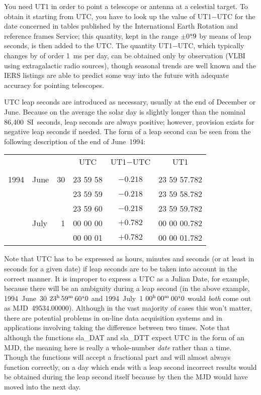 \documentclass[11pt,twoside,nolof]{starlink}
\providecommand{\tseci}[1]   {$#1$\mbox{$^{\rm s}$}}
\providecommand{\tsec}[2]    {\tseci{#1}$\hspace{-0.3em}.#2$}
\providecommand{\hms}[4]    {$#1^{\rm h}\,#2^{\rm m}\,$\tsec{#3}{#4}}
\begin{document}
You need UT1 in order to point a telescope or antenna at a
celestial target.  To obtain it
starting from UTC, you
have to look up the value of UT1$-$UTC for the date concerned
in tables published by the International Earth Rotation and
reference frames
Service;  this quantity, kept in the range
$\pm$\tsec{0}{9} by means of leap
seconds, is then added to the UTC.  The quantity UT1$-$UTC,
which typically changes by of order 1~ms per day,
can be obtained only by observation (VLBI using
extragalactic radio sources), though seasonal trends
are well known and the IERS listings are able to predict some way into
the future with adequate accuracy for pointing telescopes.

UTC leap seconds are introduced as necessary,
usually at the end of December or June.
Because on the average the solar day is slightly longer
than the nominal 86,400~SI~seconds, leap seconds are always positive;
however, provision exists for negative leap seconds if needed.
The form of a leap second can be seen from the
following description of the end of June~1994:

\hspace{3em}
\begin{tabular}{clrccc} \\
     &      &    &   UTC    & UT1$-$UTC  &    UT1       \\ \\
1994 & June & 30 & 23 59 58 & $-0.218$ & 23 59 57.782 \\
     &      &    & 23 59 59 & $-0.218$ & 23 59 58.782 \\
     &      &    & 23 59 60 & $-0.218$ & 23 59 59.782 \\
     & July &  1 & 00 00 00 & $+0.782$ & 00 00 00.782 \\
     &      &    & 00 00 01 & $+0.782$ & 00 00 01.782 \\
\end{tabular}
\goodbreak

Note that UTC has to be expressed as hours, minutes and
seconds (or at least in seconds for a given date) if leap seconds
are to be taken into account in the
correct manner.
It is improper to express a UTC as a
Julian Date, for example, because there will be an ambiguity
during a leap second (in the above example,
1994~June~30 \hms{23}{59}{60}{0} and
1994~July~1 \hms{00}{00}{00}{0} would \textit{both}\/ come out as
MJD~49534.00000).  Although in the vast majority of
cases this won't matter, there are potential problems in
on-line data acquisition systems and in applications involving
taking the difference between two times.  Note that although the functions
sla\_DAT
and
sla\_DTT
expect UTC in the form of an MJD, the meaning here is really a
whole-number \textit{date}\/ rather than a time.
Though the functions will accept
a fractional part and will almost always function correctly, on a day
which ends with a leap
second incorrect results would be obtained during the leap second
itself because by then the MJD would have moved into the next day.
\end{document}
